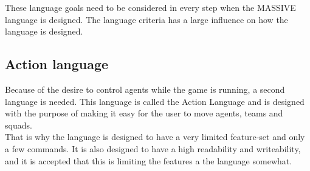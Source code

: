 These language goals need to be considered in every step when the MASSIVE language is designed.
The language criteria has a large influence on how the language is designed.

\subsection{Action language}
Because of the desire to control agents while the game is running, a second language is needed. This language is called the Action Language and is designed with the purpose of making it easy for the user to move agents, teams and squads.\\
That is why the language is designed to have a very limited feature-set and only a few commands. It is also designed to have a high readability and writeability, and it is accepted that this is limiting the features a the language somewhat. \\

